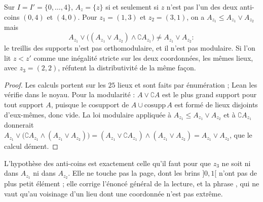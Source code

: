 \begin{encadre}
\begin{theoreme}\label{thm:156-7-grille}
Sur $I = I' = \{0, \ldots, 4\}$, $A_z = \{z\}$ si et seulement si $z$ n'est pas l'un des deux anti-coins $(0, 4)$ et $(4, 0)$. Pour $z_1 = (1, 3)$ et $z_2 = (3, 1)$, on a $A_{z_1} \leq A_{z_1} \vee A_{z_2}$ mais
\[
A_{z_1} \vee \bigl((A_{z_1} \vee A_{z_2}) \wedge \complement A_{z_1}\bigr) \neq A_{z_1} \vee A_{z_2} :
\]
le treillis des supports n'est pas orthomodulaire, et il n'est pas modulaire. Si l'on lit $z < z'$ comme une inégalité stricte sur les deux coordonnées, les mêmes lieux, avec $z_3 = (2, 2)$, réfutent la distributivité de la même façon.
\end{theoreme}
\end{encadre}

\begin{proof}
Les calculs portent sur les $25$ lieux et sont faits par énumération ; Lean les vérifie dans le noyau. Pour la modularité : $A \vee \complement A$ est le plus grand support pour tout support $A$, puisque le cosupport de $A \cup \mathrm{cosupp}\, A$ est formé de lieux disjoints d'eux-mêmes, donc vide. La loi modulaire appliquée à $A_{z_1} \leq A_{z_1} \vee A_{z_2}$ et à $\complement A_{z_1}$ donnerait $A_{z_1} \vee \bigl(\complement A_{z_1} \wedge (A_{z_1} \vee A_{z_2})\bigr) = (A_{z_1} \vee \complement A_{z_1}) \wedge (A_{z_1} \vee A_{z_2}) = A_{z_1} \vee A_{z_2}$, que le calcul dément.
\end{proof}

\begin{remarque}
L'hypothèse des anti-coins est exactement celle qu'il faut pour que $z_3$ ne soit ni dans $A_{z_1}$ ni dans $A_{z_2}$. Elle ne touche pas la page, dont les brins $]0, 1[$ n'ont pas de plus petit élément ; elle corrige l'énoncé général de la lecture, et la phrase , qui ne vaut qu'au voisinage d'un lieu dont une coordonnée n'est pas extrême.
\end{remarque}

